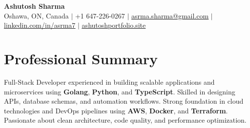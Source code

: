 \documentclass[letterpaper,11pt]{article}
\begin{document}
\begin{center}
    \textbf{\Huge Ashutosh Sharma} \\ \vspace{1pt}
    {Oshawa, ON, Canada} $|$
    \small +1 647-226-0267 $|$ \href{mailto:asrma.sharma@gmail.com}{\underline{asrma.sharma@gmail.com}} $|$
    \href{https://linkedin.com/in/asrma7}{\underline{linkedin.com/in/asrma7}} $|$
    \href{https://ashutoshportfolio.site}{\underline{ashutoshportfolio.site}}
\end{center}

\section*{Professional Summary}
Full-Stack Developer experienced in building scalable applications and microservices using \textbf{Golang}, \textbf{Python}, and \textbf{TypeScript}. Skilled in designing APIs, database schemas, and automation workflows. Strong foundation in cloud technologies and DevOps pipelines using \textbf{AWS}, \textbf{Docker}, and \textbf{Terraform}. Passionate about clean architecture, code quality, and performance optimization.

\end{document}
